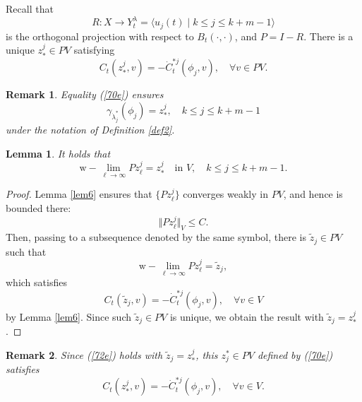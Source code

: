 \documentclass[final,a4paper]{jmsj}
\theoremstyle{thmstyleone}%
\theoremstyle{thmstyletwo}%
\newtheorem{remark}{Remark}%
\theoremstyle{thmstylethree}%
\newtheorem{lemma}[theorem]{Lemma}
\begin{document}
Recall that 
\[ R:X\rightarrow Y_t^\lambda=\langle u_j(t) \mid k\leq j\leq k+m-1\rangle \] 
is the orthogonal projection with respect to $B_t(\cdot, \cdot)$, and $P=I-R$. There is a unique $z_\ast^j \in PV$ satisfying 
\begin{equation}  
C_t(z_\ast^j, v)=-\dot C_{t}^{\ast j}(\phi_j, v), \quad \forall v\in PV. 
 \label{70e}
\end{equation} 

\begin{remark}\label{rempp} 
Equality (\ref{70e}) ensures 
\[ \gamma_{\dot \lambda_j^\ast}(\phi_j)=z_\ast^j, \quad k\leq j\leq k+m-1 \] 
under the notation of Definition \ref{def2}. 
\end{remark} 

\begin{lemma}\label{lem7}  
It holds that 
\begin{equation} 
\mbox{w}-\lim_{\ell\rightarrow \infty}Pz_{\ell}^j=z_\ast^j \quad \mbox{in $V$}, \quad  
k\leq j\leq k+m-1. 
 \label{pw}
\end{equation} 
\end{lemma} 
\begin{proof} 
Lemma \ref{lem6} ensures that $\{ Pz_{\ell}^j\}$ converges weakly in $PV$, and hence is bounded there:  
\[ \Vert Pz_{\ell}^j\Vert_V\leq C. \] 
Then, passing to a subsequence denoted by the same symbol, there is $\tilde z_j\in PV$ such that 
\[ \mbox{w}-\lim_{\ell\rightarrow \infty}Pz_{\ell}^j=\tilde z_j, \] 
which satisfies 
\begin{equation} 
C_t(\tilde z_j, v)=-\dot C_{t}^{\ast j}(\phi_j, v), \quad \forall v\in V 
 \label{72e}
\end{equation} 
by Lemma \ref{lem6}. Since such $\tilde z_j\in PV$ is unique, we obtain the result with $\tilde z_j=z_\ast^j$.  
\end{proof} 

\begin{remark}\label{remplus}
Since (\ref{72e}) holds with $\tilde z_j=z^j_\ast$, this $z_j^\ast \in PV$ defined by (\ref{70e}) satisfies 
\[ 
C_t(z_\ast^j, v)=-\dot C_{t}^{\ast j}(\phi_j, v), \quad \forall v\in V. 
\] 

\end{remark} 
\end{document}
